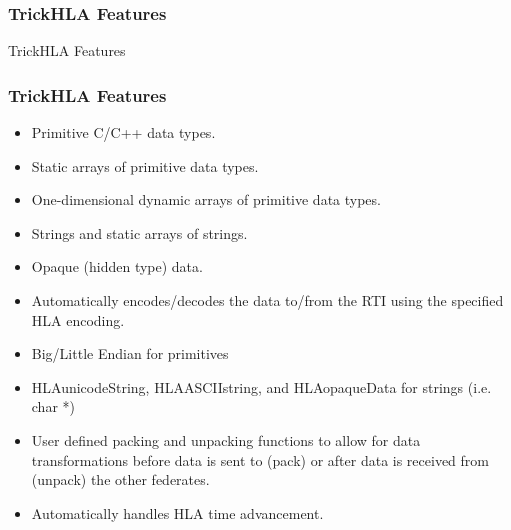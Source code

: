 \documentclass{beamer}
\begin{document}
   \begin{frame}
      \frametitle{TrickHLA Features}
      \begin{center}
      \Huge{TrickHLA Features}
      \end{center}
   \end{frame}
   
   \begin{frame}
      \frametitle{TrickHLA Features}
      \begin{itemize}
         \item Primitive C/C++ data types.
         \item Static arrays of primitive data types.
         \item One-dimensional dynamic arrays of primitive data types.
         \item Strings and static arrays of strings.
         \item Opaque (hidden type) data.
         \item Automatically encodes/decodes the data to/from the RTI using the specified HLA encoding.
         \item Big/Little Endian for primitives
         \item HLAunicodeString, HLAASCIIstring, and HLAopaqueData for strings (i.e. char *)
         \item User defined packing and unpacking functions to allow for data transformations before data is sent to (pack) or after data is received from (unpack) the other federates.
         \item Automatically handles HLA time advancement.
      \end{itemize}
   \end{frame}
   
\end{document}
